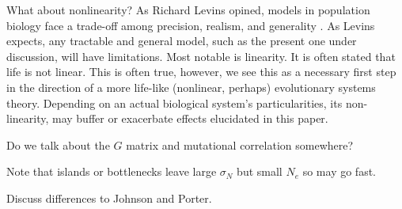 \documentclass{article}
\newcommand{\js}[1]{\todo[color=green!25]{#1}}
\newcommand{\js}[1]{{\color{green}\it #1}}
\newcommand{\1}{\mathbbm{1}}
\begin{document}


What about nonlinearity?
As Richard Levins opined, models in population biology face a trade-off among precision, realism, and generality \citep{levins1966strategy}. As Levins expects, any tractable and general model, such as the present one under discussion, will have limitations. Most notable is linearity. It is often stated that life is not linear. 
This is often true, 
however, we see this as a necessary first step in the direction of a more life-like (nonlinear, perhaps) evolutionary systems theory. Depending on an actual biological system's particularities, its non-linearity, may buffer or exacerbate effects elucidated in this paper.


Do we talk about the $G$ matrix and mutational correlation somewhere?


Note that islands or bottlenecks leave large $\sigma_N$ but small $N_e$ so may go fast.

Discuss differences to Johnson and Porter.
\end{document}
